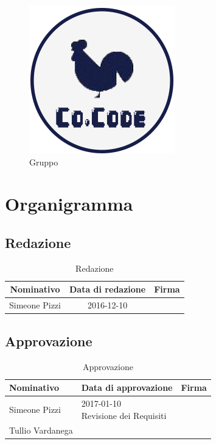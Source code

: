 \documentclass[a4paper,titlepage]{article}
\begin{document}
\begin{figure}
	\centering
	\includegraphics[scale=0.4]{img/logo_full.png}
	\\
	\LARGE Gruppo \GRUPPO
\end{figure}

\section{Organigramma}
\subsection{Redazione}
\begin{table}[htbp]
	\begin{center}
		\setlength{\extrarowheight}{\jot}
		\begin{tabular}{|c|c|p{7cm}|}
			\hline
			\textbf{Nominativo} & \textbf{Data di redazione} & \textbf{Firma} \\[1ex]
			\hline
			Simeone Pizzi & 2016-12-10 & \\[4ex]
			\hline
		\end{tabular}
	\end{center}
	\caption{Redazione}
\end{table}

\subsection{Approvazione}
\begin{table}[htbp]
	\begin{center}
		\setlength{\extrarowheight}{\jot}
		\begin{tabular}{|p{3cm}|p{4cm}|p{5cm}|}
			\hline
			\textbf{Nominativo}     & \textbf{Data di approvazione} & \textbf{Firma}  \\[1ex]
			\hline
			Simeone Pizzi &	\specialcell[t]{2017-01-10\\ Revisione dei Requisiti} &  \\[4ex]
			\hline
			Tullio Vardanega & & \\[4ex]
			\hline
		\end{tabular}
	\end{center}
	\caption{Approvazione}
\end{table}
\newpage
\end{document}
